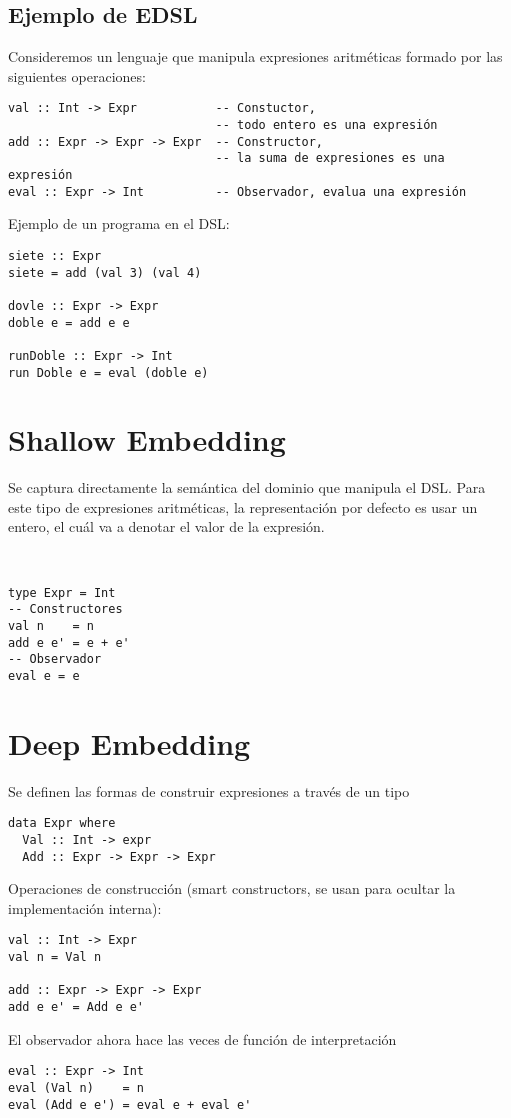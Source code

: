 \documentclass{article}
\begin{document}
\subsection*{Ejemplo de EDSL}

Consideremos un lenguaje que manipula expresiones aritméticas formado por las siguientes operaciones:

\begin{lstlisting}
val :: Int -> Expr           -- Constuctor, 
                             -- todo entero es una expresión
add :: Expr -> Expr -> Expr  -- Constructor, 
                             -- la suma de expresiones es una expresión
eval :: Expr -> Int          -- Observador, evalua una expresión
\end{lstlisting}

Ejemplo de un programa en el DSL:

\begin{lstlisting}
siete :: Expr
siete = add (val 3) (val 4)

dovle :: Expr -> Expr
doble e = add e e

runDoble :: Expr -> Int
run Doble e = eval (doble e)
\end{lstlisting}

\section{Shallow Embedding}\label{sec:shallow_embedding}

\noindent Se captura directamente la semántica del dominio que manipula el DSL. Para este tipo de expresiones aritméticas, la representación por defecto es usar un entero, el cuál va a denotar el valor de la expresión.

\

\begin{lstlisting}
type Expr = Int
-- Constructores
val n    = n
add e e' = e + e'
-- Observador
eval e = e
\end{lstlisting}

\section{Deep Embedding}\label{sec:deep_embedding}

\noindent Se definen las formas de construir expresiones a través de un tipo

\begin{lstlisting}
data Expr where
  Val :: Int -> expr
  Add :: Expr -> Expr -> Expr
\end{lstlisting}
Operaciones de construcción (smart constructors, se usan para ocultar la implementación
interna):
\begin{lstlisting}
val :: Int -> Expr
val n = Val n
  
add :: Expr -> Expr -> Expr
add e e' = Add e e'
\end{lstlisting}
El observador ahora hace las veces de función de interpretación
\begin{lstlisting}
eval :: Expr -> Int
eval (Val n)    = n
eval (Add e e') = eval e + eval e'
\end{lstlisting}
\end{document}
